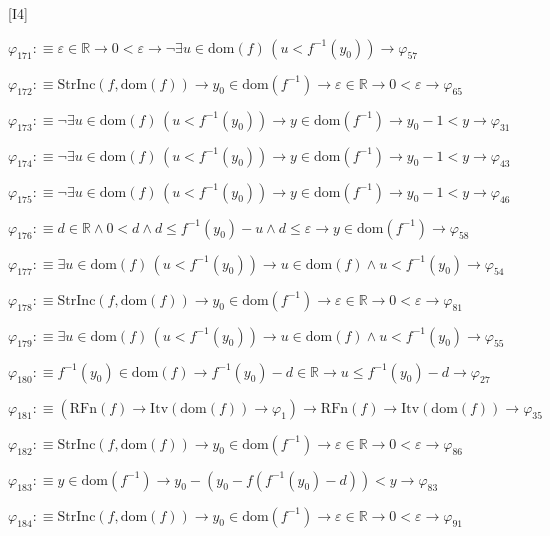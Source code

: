 \begin{fullproof}{[I4]}
\begin{abbrevlist}
\item $\varphi_{171} :\equiv \varepsilon \in \mathbb{R} \to 0 < \varepsilon \to \neg \exists u \in \mathrm{dom}(f)\,(u < f^{-1}(y_{0})) \to \varphi_{57}$
\item $\varphi_{172} :\equiv \mathrm{StrInc}(f,\mathrm{dom}(f)) \to y_{0} \in \mathrm{dom}(f^{-1}) \to \varepsilon \in \mathbb{R} \to 0 < \varepsilon \to \varphi_{65}$
\item $\varphi_{173} :\equiv \neg \exists u \in \mathrm{dom}(f)\,(u < f^{-1}(y_{0})) \to y \in \mathrm{dom}(f^{-1}) \to y_{0} - 1 < y \to \varphi_{31}$
\item $\varphi_{174} :\equiv \neg \exists u \in \mathrm{dom}(f)\,(u < f^{-1}(y_{0})) \to y \in \mathrm{dom}(f^{-1}) \to y_{0} - 1 < y \to \varphi_{43}$
\item $\varphi_{175} :\equiv \neg \exists u \in \mathrm{dom}(f)\,(u < f^{-1}(y_{0})) \to y \in \mathrm{dom}(f^{-1}) \to y_{0} - 1 < y \to \varphi_{46}$
\item $\varphi_{176} :\equiv d \in \mathbb{R} \land 0 < d \land d \leq f^{-1}(y_{0}) - u \land d \leq \varepsilon \to y \in \mathrm{dom}(f^{-1}) \to \varphi_{58}$
\item $\varphi_{177} :\equiv \exists u \in \mathrm{dom}(f)\,(u < f^{-1}(y_{0})) \to u \in \mathrm{dom}(f) \land u < f^{-1}(y_{0}) \to \varphi_{54}$
\item $\varphi_{178} :\equiv \mathrm{StrInc}(f,\mathrm{dom}(f)) \to y_{0} \in \mathrm{dom}(f^{-1}) \to \varepsilon \in \mathbb{R} \to 0 < \varepsilon \to \varphi_{81}$
\item $\varphi_{179} :\equiv \exists u \in \mathrm{dom}(f)\,(u < f^{-1}(y_{0})) \to u \in \mathrm{dom}(f) \land u < f^{-1}(y_{0}) \to \varphi_{55}$
\item $\varphi_{180} :\equiv f^{-1}(y_{0}) \in \mathrm{dom}(f) \to f^{-1}(y_{0}) - d \in \mathbb{R} \to u \leq f^{-1}(y_{0}) - d \to \varphi_{27}$
\item $\varphi_{181} :\equiv (\mathrm{RFn}(f) \to \mathrm{Itv}(\mathrm{dom}(f)) \to \varphi_{1}) \to \mathrm{RFn}(f) \to \mathrm{Itv}(\mathrm{dom}(f)) \to \varphi_{35}$
\item $\varphi_{182} :\equiv \mathrm{StrInc}(f,\mathrm{dom}(f)) \to y_{0} \in \mathrm{dom}(f^{-1}) \to \varepsilon \in \mathbb{R} \to 0 < \varepsilon \to \varphi_{86}$
\item $\varphi_{183} :\equiv y \in \mathrm{dom}(f^{-1}) \to y_{0} - (y_{0} - f(f^{-1}(y_{0}) - d)) < y \to \varphi_{83}$
\item $\varphi_{184} :\equiv \mathrm{StrInc}(f,\mathrm{dom}(f)) \to y_{0} \in \mathrm{dom}(f^{-1}) \to \varepsilon \in \mathbb{R} \to 0 < \varepsilon \to \varphi_{91}$

\end{abbrevlist}
\end{fullproof}
